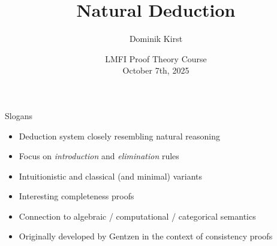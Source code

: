 \documentclass[xcolor=dvipsnames,aspectratio=169,handout]{beamer}
\title[Natural Deduction]{Natural Deduction}
\author[Dominik Kirst]{Dominik Kirst}
\date[October 7th, 2025]{LMFI Proof Theory Course\\October 7th, 2025}
\begin{document}

\newcommand\refs[1]{%
	\begin{textblock*}{8cm}(0.3cm,9.2cm)%
		\scriptsize {\color{gray}#1}
	\end{textblock*}
}

\renewcommand{\to}{\Rightarrow}

\begin{frame}
	\maketitle
\end{frame}

\begin{frame}{Slogans}
	\begin{itemize}
		\item
		Deduction system closely resembling natural reasoning
		\vspace{0.5cm}
		\item
		Focus on \emph{introduction} and \emph{elimination} rules
		\vspace{0.5cm}
		\item
		Intuitionistic and classical (and minimal) variants
		\vspace{0.5cm}
		\item
		Interesting completeness proofs
		\vspace{0.5cm}
		\item
		Connection to algebraic / computational / categorical semantics
		\vspace{0.5cm}
		\item
		Originally developed by Gentzen in the context of consistency proofs
	\end{itemize}
\end{frame}
\end{document}
